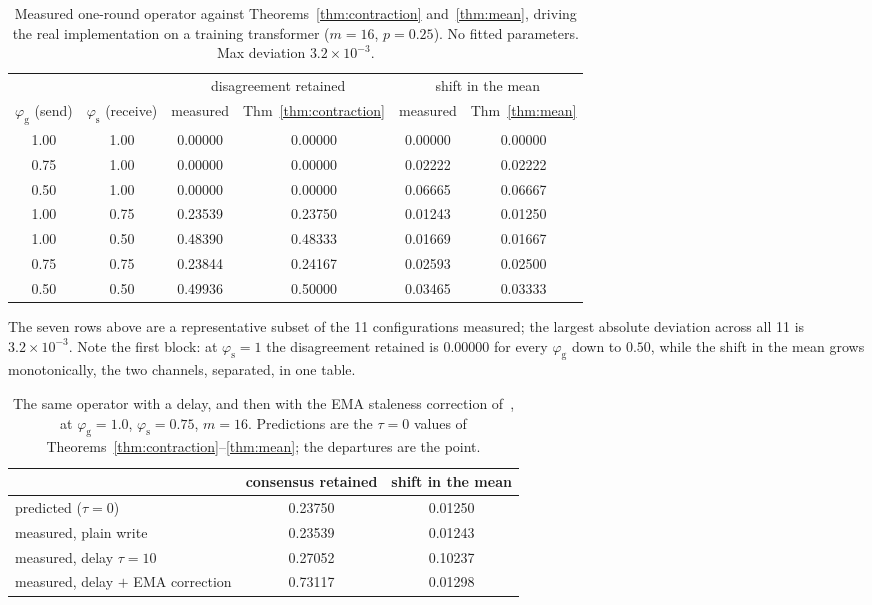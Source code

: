 \documentclass{article}
\theoremstyle{plain}
\newcommand{\pg}{\varphi_{\mathrm{g}}}
\newcommand{\ps}{\varphi_{\mathrm{s}}}
\begin{document}
\begin{table}[tb]
\centering
\caption{Measured one-round operator against Theorems~\ref{thm:contraction}
and~\ref{thm:mean}, driving the real implementation on a training transformer
($m{=}16$, $p{=}0.25$). No fitted parameters. Max deviation
$3.2\times10^{-3}$.}
\label{tab:operator}
\small
\begin{tabular}{cc cc cc}
\toprule
& & \multicolumn{2}{c}{disagreement retained}
  & \multicolumn{2}{c}{shift in the mean} \\
\cmidrule(lr){3-4}\cmidrule(lr){5-6}
$\pg$ (send) & $\ps$ (receive) & measured & Thm~\ref{thm:contraction}
              & measured & Thm~\ref{thm:mean} \\
\midrule
1.00 & 1.00 & 0.00000 & 0.00000 & 0.00000 & 0.00000 \\
0.75 & 1.00 & 0.00000 & 0.00000 & 0.02222 & 0.02222 \\
0.50 & 1.00 & 0.00000 & 0.00000 & 0.06665 & 0.06667 \\
\midrule
1.00 & 0.75 & 0.23539 & 0.23750 & 0.01243 & 0.01250 \\
1.00 & 0.50 & 0.48390 & 0.48333 & 0.01669 & 0.01667 \\
0.75 & 0.75 & 0.23844 & 0.24167 & 0.02593 & 0.02500 \\
0.50 & 0.50 & 0.49936 & 0.50000 & 0.03465 & 0.03333 \\
\bottomrule
\end{tabular}
\end{table}

The seven rows above are a representative subset of the 11 configurations
measured; the largest absolute deviation across all 11 is
$3.2\times10^{-3}$. Note the first block: at $\ps{=}1$ the disagreement
retained is $0.00000$ for every $\pg$ down to $0.50$, while the shift in the
mean grows monotonically, the two channels, separated, in one table.

\begin{table}[tb]
\centering
\caption{The same operator with a delay, and then with the EMA staleness
correction of~\citet{ajanthan2026asyncmesh}, at $\pg{=}1.0$, $\ps{=}0.75$,
$m{=}16$. Predictions are the $\tau{=}0$ values of
Theorems~\ref{thm:contraction}--\ref{thm:mean}; the departures are the point.}
\label{tab:corrector}
\small
\begin{tabular}{lcc}
\toprule
& consensus retained & shift in the mean \\
\midrule
predicted ($\tau = 0$) & 0.23750 & 0.01250 \\
measured, plain write & 0.23539 & 0.01243 \\
measured, delay $\tau{=}10$ & 0.27052 & 0.10237 \\
measured, delay $+$ EMA correction & 0.73117 & 0.01298 \\
\bottomrule
\end{tabular}
\end{table}
\end{document}
